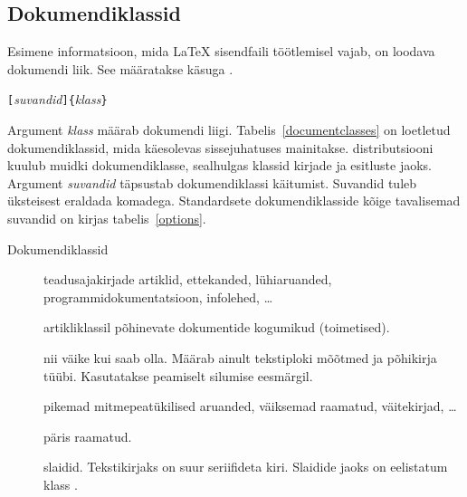 {\subsection {Dokumendiklassid}\label{sec:documentclass}

Esimene informatsioon, mida \LaTeX{} sisendfaili töötlemisel vajab, on
loodava dokumendi liik. See määratakse käsuga .
\begin{lscommand}
\verb|[|\emph{suvandid}\verb|]{|\emph{klass}\verb|}|
\end{lscommand}
\noindent Argument \emph{klass} määrab dokumendi liigi.
Tabelis~\ref{documentclasses} on loetletud dokumendiklassid, mida
käesolevas sissejuhatuses mainitakse. \LaTeXe{} distributsiooni
kuulub muidki dokumendiklasse, sealhulgas klassid kirjade ja esitluste
jaoks. Argument \emph{suvandid} täpsustab dokumendiklassi
käitumist. Suvandid tuleb üksteisest eraldada komadega. Standardsete
dokumendiklasside kõige tavalisemad suvandid on kirjas
tabelis~\ref{options}.

\begin{table}[!bp]
\caption{Dokumendiklassid} \label{documentclasses}
\begin{lined}{\textwidth}
\begin{description}

\item [\normalfont{}] teadusajakirjade artiklid,
  ettekanded, lühiaruanded, programmidokumentatsioon, infolehed, \ldots{}
\item [\normalfont{}] artikliklassil põhinevate dokumentide
  kogumikud (toimetised). 
\item [\normalfont{}] nii väike kui saab olla. Määrab
  ainult tekstiploki mõõtmed ja põhikirja tüübi. Kasutatakse peamiselt
  silumise eesmärgil. 
\item [\normalfont{}] pikemad mitmepeatükilised aruanded,
  väiksemad raamatud, väitekirjad, \ldots{}
\item [\normalfont{}] päris raamatud.
\item [\normalfont{}] slaidid. Tekstikirjaks on suur
  seriifideta kiri. Slaidide jaoks on eelistatum klass .
\end{description}
\end{lined}
\end{table}

}
